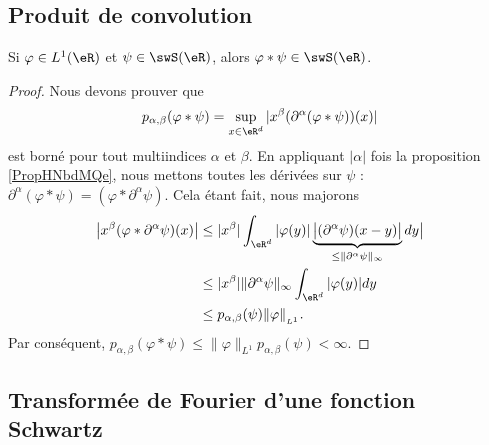 \subsection{Produit de convolution}

\begin{proposition}
    Si \( \varphi\in L^1(\eR)\) et \( \psi\in\swS(\eR)\), alors \( \varphi * \psi\in \swS(\eR)\).
\end{proposition}

\begin{proof}
    Nous devons prouver que
    \begin{equation}
        p_{\alpha,\beta}(\varphi*\psi)=\sup_{x\in \eR^d}| x^{\beta}(\partial^{\alpha}(\varphi*\psi))(x) |
    \end{equation}
    est borné pour tout multiindices \( \alpha\) et \( \beta\). En appliquant \( | \alpha |\) fois la proposition \ref{PropHNbdMQe}, nous mettons toutes les dérivées sur \( \psi\) : \( \partial^{\alpha}(\varphi*\psi)=(\varphi*\partial^{\alpha}\psi)\). Cela étant fait, nous majorons
    \begin{subequations}
        \begin{align}
            \big| x^{\beta}(\varphi*\partial^{\alpha}\psi)(x) \big|&\leq| x^{\beta} |\int_{\eR^d} |\varphi(y)|\underbrace{\big| (\partial^{\alpha}\psi)(x-y)\big|}_{\leq\| \partial^{\alpha}\psi \|_{\infty}} dy \big|\\
            &\leq | x^{\beta} |  \| \partial^{\alpha}\psi \|_{\infty}\int_{\eR^d}| \varphi(y) |dy\\
            &\leq p_{\alpha,\beta}(\psi)\| \varphi \|_{_{L^1}}.
        \end{align}
    \end{subequations}
    Par conséquent, \( p_{\alpha,\beta}(\varphi*\psi)\leq \| \varphi \|_{L^1}p_{\alpha,\beta}(\psi)<\infty\).
\end{proof}

\subsection{Transformée de Fourier d'une fonction Schwartz}

